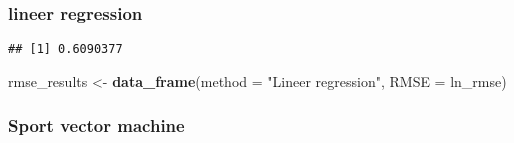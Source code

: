 \documentclass[]{article}
\newenvironment{Shaded}{\begin{snugshade}}{\end{snugshade}}
\newcommand{\CommentTok}[1]{\textcolor[rgb]{0.56,0.35,0.01}{\textit{#1}}}
\newcommand{\DataTypeTok}[1]{\textcolor[rgb]{0.13,0.29,0.53}{#1}}
\newcommand{\KeywordTok}[1]{\textcolor[rgb]{0.13,0.29,0.53}{\textbf{#1}}}
\newcommand{\NormalTok}[1]{#1}
\newcommand{\OperatorTok}[1]{\textcolor[rgb]{0.81,0.36,0.00}{\textbf{#1}}}
\newcommand{\StringTok}[1]{\textcolor[rgb]{0.31,0.60,0.02}{#1}}
\begin{document}
\hypertarget{lineer-regression}{%
\subsubsection{lineer regression}\label{lineer-regression}}

\begin{Shaded}
\end{Shaded}

\begin{verbatim}
## [1] 0.6090377
\end{verbatim}

\begin{Shaded}
\begin{Highlighting}[]
\NormalTok{rmse_results <-}\StringTok{ }\KeywordTok{data_frame}\NormalTok{(}\DataTypeTok{method =} \StringTok{"Lineer regression"}\NormalTok{, }\DataTypeTok{RMSE =}\NormalTok{  ln_rmse)}
\end{Highlighting}
\end{Shaded}

\hypertarget{sport-vector-machine}{%
\subsubsection{Sport vector machine}\label{sport-vector-machine}}
\end{document}

